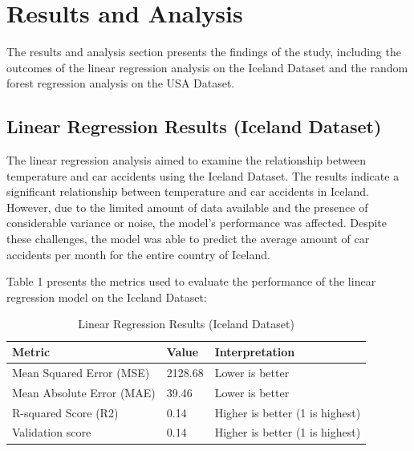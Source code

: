 \documentclass{article}
\begin{document}
\section{Results and Analysis}

The results and analysis section presents the findings of the study, including the outcomes of the linear regression analysis on the Iceland Dataset and the random forest regression analysis on the USA Dataset.

\subsection{Linear Regression Results (Iceland Dataset)}

The linear regression analysis aimed to examine the relationship between temperature and car accidents using the Iceland Dataset. The results indicate a significant relationship between temperature and car accidents in Iceland. However, due to the limited amount of data available and the presence of considerable variance or noise, the model's performance was affected. Despite these challenges, the model was able to predict the average amount of car accidents per month for the entire country of Iceland.

Table 1 presents the metrics used to evaluate the performance of the linear regression model on the Iceland Dataset:

\begin{table}[htbp]
    \centering
    \caption{Linear Regression Results (Iceland Dataset)}
    \begin{tabular}{lll}
        \hline
        Metric                    & Value                           & Interpretation                  \\
        \hline
        Mean Squared Error (MSE)  & 2128.68                         & Lower is better                 \\
        Mean Absolute Error (MAE) & 39.46                           & Lower is better                 \\
        R-squared Score (R2)      & 0.14                            & Higher is better (1 is highest) \\
        Validation score          & 0.14
                                  & Higher is better (1 is highest)                                   \\
        \hline
    \end{tabular}
\end{table}
\end{document}
